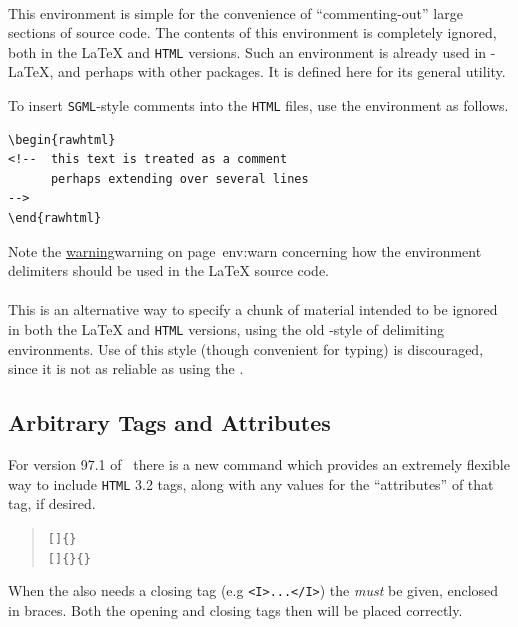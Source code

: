 %
%
\paragraph*{\label{comment}}
This environment is simple for the convenience of ``commenting-out''
large sections of source code.
The contents of this environment is completely ignored,
both in the \LaTeX{} and \texttt{HTML} versions.
Such an environment is already used in \AmS-\LaTeX,
and perhaps with other packages.
It is defined here for its general utility.

\noindent
To insert \texttt{SGML}-style comments into the \texttt{HTML} files,
use the  environment as follows.
\begin{small}
\begin{verbatim}
\begin{rawhtml}
<!--  this text is treated as a comment
      perhaps extending over several lines 
-->
\end{rawhtml}
\end{verbatim}
\end{small}

\noindent
Note the \hyperref[page]{warning}{warning on page~}{}{env:warn}
concerning how the environment delimiters should be used in the
\LaTeX{} source code.


%
\paragraph*{\label{endcomment}}
This is an alternative way to specify a chunk of material intended
to be ignored in both the \LaTeX{} and \texttt{HTML} versions,
using the old \AmS-style of delimiting environments.
Use of this style (though convenient for typing) is discouraged,
since it is not as reliable as using the  .


\subsection{Arbitrary Tags and Attributes\label{sec:arbtags}}%
%
For version 97.1 of \latextohtml\ there is a new command which provides 
an extremely flexible way to include \texttt{HTML} 3.2 tags, along with
any values for the ``attributes'' of that tag, if desired.
\begin{quote}
\verb|[|\verb|]{|\verb|}|\label{HTMLtag}\\
\verb|[|\verb|]{|\verb|}{|\verb|}|
\end{quote}
When the  also needs a closing tag (e.g \texttt{<I>...</I>})
the  \emph{must} be given, enclosed in braces.
Both the opening and closing tags then will be placed correctly.

